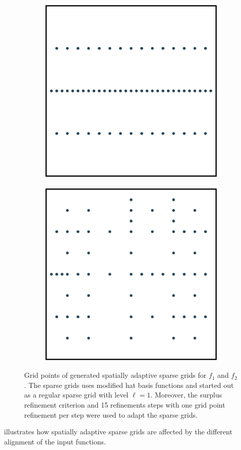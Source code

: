 \documentclass[
  a4paper,  %
  twoside,  %
  bibliography=totoc,
  headsepline,
  cleardoublepage=empty,
  parskip=half,
  draft=false
]{scrbook}
\begin{document}
\begin{mdframed}[style=style]
\begin{figure}[H]
\begin{subfigure}{.5\textwidth}
  \centering
  \includegraphics[width=.65\linewidth]{graphics/grid_f1}
  \label{fig:grid_f1}
\vspace{2.5mm}
\end{subfigure}%
\begin{subfigure}{.5\textwidth}
  \centering
  \includegraphics[width=.65\linewidth]{graphics/grid_f2}
  \label{fig:grid_f2}
\vspace{2.5mm}
\end{subfigure}
\delimit
\caption{Grid points of generated spatially adaptive sparse grids for $f_1$ and $f_2$.
The sparse grids uses modified hat basis functions and started out as a regular sparse grid with level $\ell=1$. Moreover, the surplus refinement criterion and 15 refinements steps with one grid point refinement per step were used to adapt the sparse grids.}
\label{fig:grids}
\end{figure}
\end{mdframed}
%
 illustrates how spatially adaptive sparse grids are affected by the different alignment of the input functions.
\end{document}
